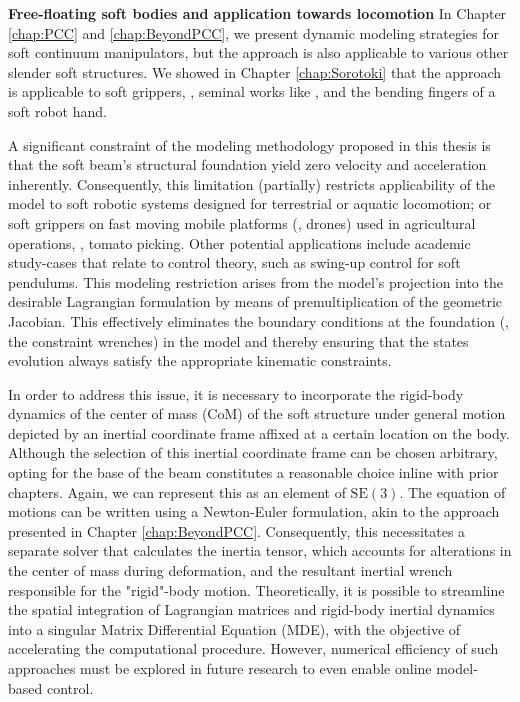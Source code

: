 \textbf{Free-floating soft bodies and application towards locomotion} In Chapter \ref{chap:PCC} and \ref{chap:BeyondPCC}, we present dynamic modeling strategies for soft continuum manipulators, but the approach is also applicable to various other slender soft structures. We showed in Chapter \ref{chap:Sorotoki} that the approach is applicable to soft grippers, \eg, seminal works like \cite{Sinatra2019Aug,Suzumori1992}, and the bending fingers of a soft robot hand. 

A significant constraint of the modeling methodology proposed in this thesis is that the soft beam's structural foundation yield zero velocity and acceleration inherently. Consequently, this limitation (partially) restricts applicability of the model to soft robotic systems designed for terrestrial or aquatic locomotion; or soft grippers on fast moving mobile platforms (\eg, drones) used in agricultural operations, \eg, tomato picking. Other potential applications include academic study-cases that relate to control theory, such as swing-up control for soft pendulums. This modeling restriction arises from the model's projection into the desirable Lagrangian formulation by means of premultiplication of the geometric Jacobian. This effectively eliminates the boundary conditions at the foundation (\ie, the constraint wrenches) in the model and thereby ensuring that the states evolution always satisfy the appropriate kinematic constraints. 

In order to address this issue, it is necessary to incorporate the rigid-body dynamics of the center of mass (CoM) of the soft structure under general motion depicted by an inertial coordinate frame affixed at a certain location on the body. Although the selection of this inertial coordinate frame can be chosen arbitrary, opting for the base of the beam constitutes a reasonable choice inline with prior chapters. Again, we can represent this as an element of $\textrm{SE}(3)$. The equation of motions can be written using a Newton-Euler formulation, akin to the approach presented in Chapter \ref{chap:BeyondPCC}. Consequently, this necessitates a separate solver that calculates the inertia tensor, which accounts for alterations in the center of mass during deformation, and the resultant inertial wrench responsible for the "rigid"-body motion. Theoretically, it is possible to streamline the spatial integration of Lagrangian matrices and rigid-body inertial dynamics into a singular Matrix Differential Equation (MDE), with the objective of accelerating the computational procedure. However, numerical efficiency of such approaches must be explored in future research to even enable online model-based control.

